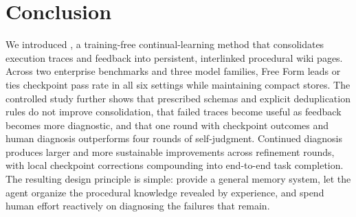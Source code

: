 \section{Conclusion}
\label{sec:conclusion}

We introduced \method{}, a training-free continual-learning method that
consolidates execution traces and feedback into persistent, interlinked
procedural wiki pages. Across two enterprise benchmarks and three model
families, Free Form \method{} leads or ties checkpoint pass rate in all six
settings while maintaining compact stores. The controlled study further shows
that prescribed schemas and explicit deduplication rules do not improve
consolidation, that failed traces become useful as feedback becomes more
diagnostic, and that one round with checkpoint outcomes and human diagnosis
outperforms four rounds of self-judgment. Continued diagnosis produces larger
and more sustainable improvements across refinement rounds, with local
checkpoint corrections compounding into end-to-end task completion. The
resulting design principle is simple: provide a general memory system, let the
agent organize the procedural knowledge revealed by experience, and spend human
effort reactively on diagnosing the failures that remain.
